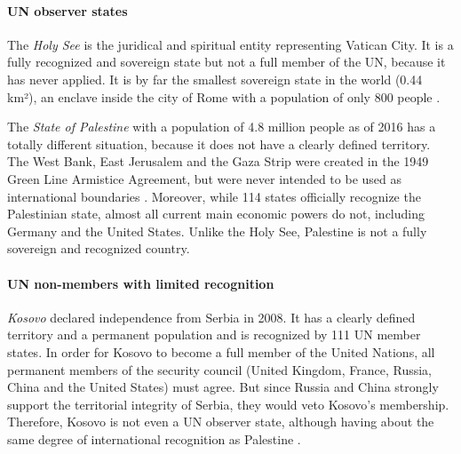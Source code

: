 \paragraph{UN observer states} %
\label{par:un_observer_states}

The \emph{Holy See} is the juridical and spiritual entity representing Vatican City. It is a fully recognized and sovereign state but not a full member of the UN, because it has never applied. It is by far the smallest sovereign state in the world (0.44 km²), an enclave inside the city of Rome with a population of only 800 people \cite{VaticanPopulation}.

The \emph{State of Palestine} with a population of 4.8 million people as of 2016 \cite{PalestinePopulation} has a totally different situation, because it does not have a clearly defined territory. The West Bank, East Jerusalem and the Gaza Strip were created in the 1949 Green Line Armistice Agreement, but were never intended to be used as international boundaries \cite{PalestineTerritory}. Moreover, while 114 states officially recognize the Palestinian state, almost all current main economic powers do not, including Germany and the United States. Unlike the Holy See, Palestine is not a fully sovereign and recognized country.


\paragraph{UN non-members with limited recognition} %
\label{par:un_non_members_with_limited_recognition}

\emph{Kosovo} declared independence from Serbia in 2008. It has a clearly defined territory and a permanent population and is recognized by 111 UN member states. In order for Kosovo to become a full member of the United Nations, all permanent members of the security council (United Kingdom, France, Russia, China and the United States) must agree. But since Russia and China strongly support the territorial integrity of Serbia, they would veto Kosovo's membership. Therefore, Kosovo is not even a UN observer state, although having about the same degree of international recognition as Palestine \cite{KosovoThanksYou}.

